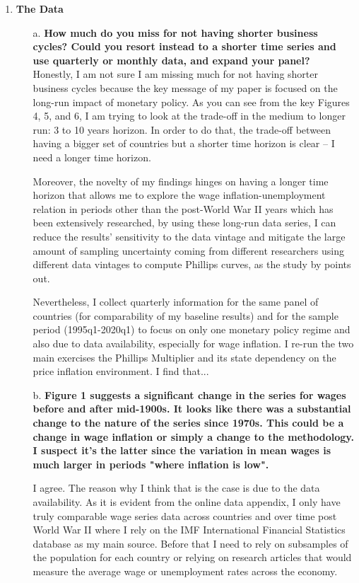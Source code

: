 \documentclass[12pt]{article}
\begin{document}
\begin{enumerate}
\item \textbf{The Data}

\begin{itemize}
    \item[a.] \textbf{How much do you miss for not having shorter business cycles? Could you resort instead to a shorter time series and use quarterly or monthly data, and expand your panel?} \\

Honestly, I am not sure I am missing much for not having shorter business cycles because the key message of my paper is focused on the long-run impact of monetary policy. As you can see from the key Figures 4, 5, and 6, I am trying to look at the trade-off in the medium to longer run: 3 to 10 years horizon. In order to do that, the trade-off between having a bigger set of countries but a shorter time horizon is clear – I need a longer time horizon.

Moreover, the novelty of my findings hinges on having a longer time horizon that allows me to explore the wage inflation-unemployment relation in periods other than the post-World War II years which has been extensively researched, by using these long-run data series, I can reduce the results’ sensitivity to the data vintage and mitigate the large amount of sampling uncertainty coming from different researchers using different data vintages to compute Phillips curves, as the study by \cite{Mavroeidis2014} points out.

Nevertheless, I collect quarterly information for the same panel of countries (for comparability of my baseline results) and for the sample period (1995q1-2020q1) to focus on only one monetary policy regime and also due to data availability, especially for wage inflation. I re-run the two main exercises the Phillips Multiplier and its state dependency on the price inflation environment. I find that...

    \item[b.] \textbf{Figure 1 suggests a significant change in the series for wages before and after mid-1900s. It looks like there was a substantial change to the nature of the series since 1970s. This could be a change in wage inflation or simply a change to the methodology. I suspect it's the latter since the variation in mean wages is much larger in periods "where inflation is low".}

I agree. The reason why I think that is the case is due to the data availability. As it is evident from the online data appendix, I only have truly comparable wage series data across countries and over time post World War II where I rely on the IMF International Financial Statistics database as my main source. Before that I need to rely on subsamples of the population for each country or relying on research articles that would measure the average wage or unemployment rates across the economy.


\end{itemize}
\end{enumerate}
\end{document}
